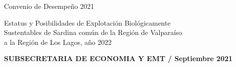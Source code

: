 \documentclass[12pt, oneside]{article} %
\begin{document}
\begin{titlepage}
\centering \fontsize{9pt}{8pt}\selectfont
            \vspace*{-3mm} 
            \hfill Convenio de Desempeño 2021 
            
\centering \fontsize{9pt}{8pt}\selectfont
            \vspace*{-16mm} 
            \hfill \begin{flushright}
            Estatus y Posibilidades de Explotación Biológicamente \\
            Sustentables de Sardina común de la  Región de Valparaíso \\ 
            a la Región de Los Lagos, año 2022 \\
              \end{flushright} 
            \vspace*{-5mm} 
            \hfill \textbf{SUBSECRETARIA DE ECONOMIA Y EMT / Septiembre 2021}



\end{titlepage}
\end{document}
